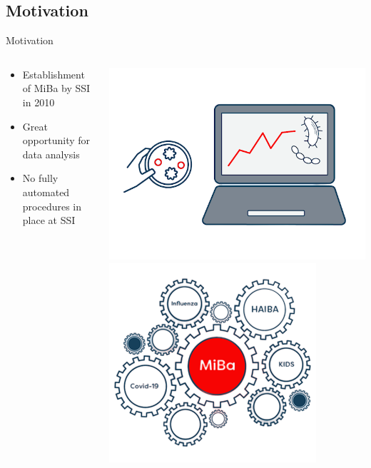 \documentclass[aspectratio=169]{beamer}
\begin{document}
\hypertarget{motivation}{%
\subsection{Motivation}\label{motivation}}

\begin{frame}{Motivation}
\begin{columns}
\begin{column}{.58\textwidth}
\begin{itemize}
  \item Establishment of MiBa by SSI in 2010
  \item Great opportunity for data analysis
  \item No fully automated procedures in place at SSI
\end{itemize}
\end{column}
\hfill
\begin{column}{.38\textwidth}

 \tiny


\includegraphics[width=0.75\linewidth]{../figures/MiBaPetriComp} \includegraphics[width=0.75\linewidth]{../figures/MiBa} 

 \normalsize
\end{column}
\end{columns}
\end{frame}
\end{document}
